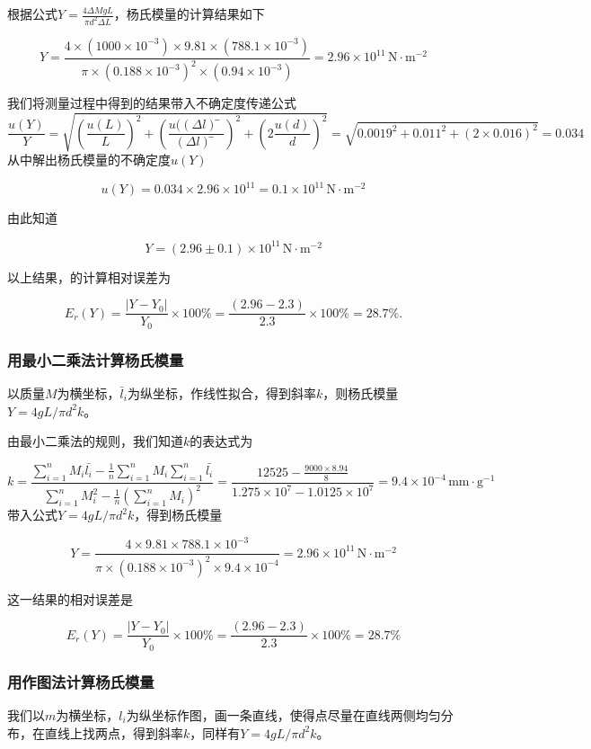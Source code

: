 \documentclass[zihao=5, UTF8]{article}
\theoremstyle{MyLineTheoremStyle} %
\theoremstyle{MyBlockTheoremStyle} %
\theoremstyle{MySubsubsectionStyle} %
\begin{document}
根据公式$Y = \frac{4\Delta MgL}{\pi d^2 \Delta L}$，杨氏模量的计算结果如下

\[Y = \frac{4 \times (1000 \times 10^{-3}) \times 9.81 \times (788.1 \times 10^{-3})}{\pi \times (0.188 \times 10^{-3})^{2} \times (0.94 \times 10^{-3})} = 2.96 \times 10^{11} \, \text{N} \cdot \text{m}^{-2} \]

我们将测量过程中得到的结果带入不确定度传递公式
\[
  \frac{u(Y)}{Y} = \sqrt{\left(\frac{u(L)}{L}\right)^2 + \left(\frac{u((\Delta l) ̅}{(\Delta l) ̅}\right)^2 + \left(2 \frac{u(d)}{d}\right)^2} = \sqrt{0.0019^2 + 0.011^2 + (2 \times 0.016)^2 } = 0.034
\]
从中解出杨氏模量的不确定度$u(Y)$

\[ u(Y) = 0.034 \times 2.96 \times 10^{11} = 0.1 \times 10^{11} \, \text{N} \cdot \text{m}^{-2} \]

由此知道

\[ Y = (2.96 \pm 0.1) \times 10^{11} \, \text{N} \cdot \text{m}^{-2} \]

以上结果，的计算相对误差为

\[
E_r (Y) = \frac{|Y - Y_0|}{Y_0} \times 100\% = \frac{(2.96 - 2.3)}{2.3} \times 100\% = 28.7\%.
\]
\subsubsection{用最小二乘法计算杨氏模量}

以质量$M$为横坐标，$\bar l_i$为纵坐标，作线性拟合，得到斜率$k$，则杨氏模量$Y = 4gL/\pi d^2 k$。

由最小二乘法的规则，我们知道$k$的表达式为

\[ 
k = \frac{\sum_{i=1}^{n} M_i \bar{l_i} - \frac{1}{n} \sum_{i=1}^{n} M_i \sum_{i=1}^{n} \bar{l_i}}{\sum_{i=1}^{n} M_i^2 - \frac{1}{n} (\sum_{i=1}^{n} M_i)^2} = \frac{12525 - \frac{9000 \times 8.94}{8}}{1.275 \times 10^7 - 1.0125 \times 10^7} = 9.4 \times 10^{-4} \, \text{mm} \cdot \text{g}^{-1}
\]
带入公式$Y = 4gL/\pi d^2 k$，得到杨氏模量

\[ Y = \frac{4 \times 9.81 \times 788.1 \times 10^{-3}}{\pi \times (0.188 \times 10^{-3})^2 \times 9.4 \times 10^{-4}} = 2.96 \times 10^{11} \, \text{N} \cdot \text{m}^{-2} \]

这一结果的相对误差是

\[ E_r (Y) = \frac{|Y - Y_0|}{Y_0} \times 100\% = \frac{(2.96 - 2.3)}{2.3} \times 100\% = 28.7\% \]

\subsubsection{用作图法计算杨氏模量}
我们以$m$为横坐标，$l_i$为纵坐标作图，画一条直线，使得点尽量在直线两侧均匀分布，在直线上找两点，得到斜率$k$，同样有$Y = 4gL/\pi d^2 k$。
\end{document}
